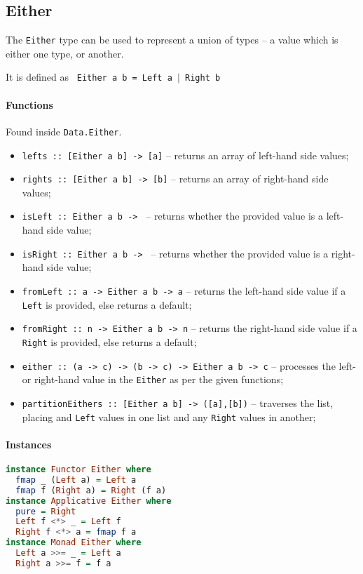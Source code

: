 \subsection{Either}
The \texttt{Either} type can be used to represent a union of types -- a value which is either one type, or another.

It is defined as \texttt{ Either a b = Left a $\mid$ Right b}

\paragraph{Functions}
Found inside \texttt{Data.Either}.
\begin{itemize}
  \item \texttt{lefts :: [Either a b] -> [a]} -- returns an array of left-hand side values;
  \item \texttt{rights :: [Either a b] -> [b]} -- returns an array of right-hand side values;
  \item \texttt{isLeft :: Either a b -> } -- returns whether the provided value is a left-hand side value;
  \item \texttt{isRight :: Either a b -> } -- returns whether the provided value is a right-hand side value;
  \item \texttt{fromLeft :: a -> Either a b -> a} -- returns the left-hand side value if a \texttt{Left} is provided, else returns a default;
  \item \texttt{fromRight :: n -> Either a b -> n} -- returns the right-hand side value if a \texttt{Right} is provided, else returns a default;
  \item \texttt{either :: (a -> c) -> (b -> c) -> Either a b -> c} -- processes the left- or right-hand value in the \texttt{Either} as per the given functions;
  \item \texttt{partitionEithers :: [Either a b] -> ([a],[b])} -- traverses the list, placing and \texttt{Left} values in one list and any \texttt{Right} values in another;
\end{itemize}

\paragraph{Instances}
\begin{lstlisting}[language=haskell]
instance Functor Either where
  fmap _ (Left a) = Left a
  fmap f (Right a) = Right (f a)
instance Applicative Either where
  pure = Right
  Left f <*> _ = Left f
  Right f <*> a = fmap f a
instance Monad Either where
  Left a >>= _ = Left a
  Right a >>= f = f a
\end{lstlisting}

